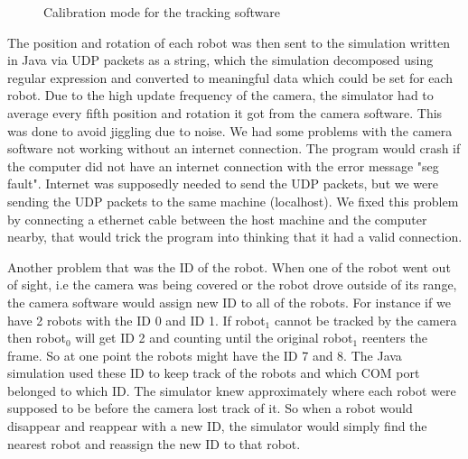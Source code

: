 \begin{figure}
     \hfill
    
            \caption[Calibrating colors]{Calibration mode for the tracking software}
            \label{fig:calibration}
\end{figure}
\newpage
The position and rotation of each robot was then sent to the simulation written in Java via UDP packets as a string, which the simulation decomposed using regular expression and converted to meaningful data which could be set for each robot. Due to the high update frequency of the camera, the simulator had to average every fifth position and rotation it got from the camera software. This was done to avoid jiggling due to noise. We had some problems with the camera software not working without an internet connection. The program would crash if the computer did not have an internet connection with the error message "seg fault". Internet was supposedly needed to send the UDP packets, but we were sending the UDP packets to the same machine (localhost).
We fixed this problem by connecting a ethernet cable between the host machine and the computer nearby, that would trick the program into thinking that it had a valid connection.

Another problem that was the ID of the robot. When one of the robot went out of sight, i.e the camera was being covered or the robot drove outside of its range, the camera software would assign new ID to all of the robots. For instance if we have 2 robots with the ID 0 and ID 1. If robot$_1$ cannot be tracked by the camera then robot$_0$ will get ID 2 and counting until the original robot$_1$ reenters the frame. So at one point the robots might have the ID 7 and 8. The Java simulation used these ID to keep track of the robots and which COM port belonged to which ID. The simulator knew approximately where each robot were supposed to be before the camera lost track of it. So when a robot would disappear and reappear with a new ID, the simulator would simply find the nearest robot and reassign the new ID to that robot. 

